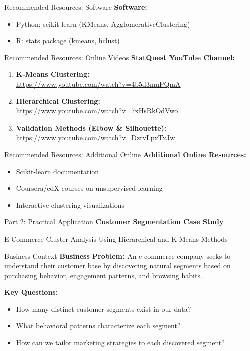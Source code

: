 \documentclass[aspectratio=169,ignorenonframetext]{beamer}
\begin{document}
\begin{frame}{Recommended Resources: Software}
\textbf{Software:}

\begin{itemize}
\item
  Python: scikit-learn (KMeans, AgglomerativeClustering)
\item
  R: stats package (kmeans, hclust)
\end{itemize}
\end{frame}

\begin{frame}{Recommended Resources: Online Videos}
\textbf{StatQuest YouTube Channel:}

\begin{enumerate}
\item
  \textbf{K-Means Clustering:}\\
  \url{https://www.youtube.com/watch?v=4b5d3muPQmA}
\item
  \textbf{Hierarchical Clustering:}\\
  \url{https://www.youtube.com/watch?v=7xHsRkOdVwo}
\item
  \textbf{Validation Methods (Elbow \& Silhouette):}\\
  \url{https://www.youtube.com/watch?v=DzrvLpxTxJw}
\end{enumerate}
\end{frame}

\begin{frame}{Recommended Resources: Additional Online}
\textbf{Additional Online Resources:}

\begin{itemize}
\item
  Scikit-learn documentation
\item
  Coursera/edX courses on unsupervised learning
\item
  Interactive clustering visualizations
\end{itemize}
\end{frame}

\begin{frame}{Part 2: Practical Application}
\textbf{ Customer Segmentation Case Study }

E-Commerce Cluster Analysis Using Hierarchical and K-Means Methods
\end{frame}

\begin{frame}{Business Context}
\textbf{Business Problem:} An e-commerce company seeks to understand
their customer base by discovering natural segments based on purchasing
behavior, engagement patterns, and browsing habits.

\textbf{Key Questions:}

\begin{itemize}
\item
  How many distinct customer segments exist in our data?
\item
  What behavioral patterns characterize each segment?
\item
  How can we tailor marketing strategies to each discovered segment?
\end{itemize}
\end{frame}
\end{document}
